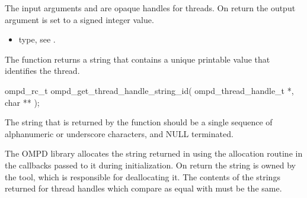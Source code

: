 %

\argdesc
The input arguments  and  are opaque handles for threads.
On return the output argument  is set to a signed integer value.

\crossreferences
\begin{itemize}
	\item {} type, see .
\end{itemize}

\label{ompd:ompd_get_thread_handle_string_id}
\summary
The  function returns a string
that contains a unique printable value that identifies the thread.

\format

\cspecificstart
\begin{ompSyntax}
ompd_rc_t ompd_get_thread_handle_string_id(
  ompd_thread_handle_t *,
  char **
);
\end{ompSyntax}
\cspecificend


\descr
The string that is returned by the function should be a single sequence of alphanumeric or 
underscore characters, and NULL terminated.

The OMPD library allocates the string returned in  using the allocation 
routine in the callbacks passed to it during initialization. On return the string is owned by the 
tool, which is responsible for deallocating it. The contents of the strings returned for thread 
handles which compare as equal with  must be the same.

